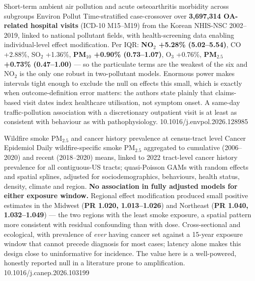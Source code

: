 \documentclass[10pt]{article}
\begin{document}

{Short-term ambient air pollution and acute osteoarthritis morbidity across subgroups}
{Environ Pollut}
{Time-stratified case-crossover over \textbf{3,697,314 OA-related hospital visits}
(ICD-10 M15--M19) from the Korean NHIS-NSC 2002--2019, linked to national pollutant fields,
with health-screening data enabling individual-level effect modification. Per IQR:
\textbf{NO$_2$ +5.28\% (5.02--5.54)}, CO +2.88\%, SO$_2$ +1.36\%,
\textbf{PM$_{10}$ +0.90\% (0.73--1.07)}, O$_3$ +0.76\%,
\textbf{PM$_{2.5}$ +0.73\% (0.47--1.00)} --- so the particulate terms are the weakest of the
six and NO$_2$ is the only one robust in two-pollutant models. Enormous power makes
intervals tight enough to exclude the null on effects this small, which is exactly when
outcome-definition error matters: the authors state plainly that claims-based visit dates
index healthcare utilisation, not symptom onset. A same-day traffic-pollution association
with a discretionary outpatient visit is at least as consistent with behaviour as with
pathophysiology.}
{10.1016/j.envpol.2026.128985}

{Wildfire smoke PM$_{2.5}$ and cancer history prevalence at census-tract level}
{Cancer Epidemiol}
{Daily wildfire-specific smoke PM$_{2.5}$ aggregated to cumulative (2006--2020) and recent
(2018--2020) means, linked to 2022 tract-level cancer history prevalence for all
contiguous-US tracts; quasi-Poisson GAMs with random effects and spatial splines, adjusted
for sociodemographics, behaviours, health status, density, climate and region.
\textbf{No association in fully adjusted models for either exposure window.} Regional
effect modification produced small positive estimates in the Midwest
(\textbf{PR 1.020, 1.013--1.026}) and Northeast (\textbf{PR 1.040, 1.032--1.049}) --- the
two regions with the least smoke exposure, a spatial pattern more consistent with residual
confounding than with dose. Cross-sectional and ecological, with prevalence of \emph{ever}
having cancer set against a 15-year exposure window that cannot precede diagnosis for most
cases; latency alone makes this design close to uninformative for incidence. The value
here is a well-powered, honestly reported null in a literature prone to amplification.}
{10.1016/j.canep.2026.103199}

\clearpage

\end{document}
